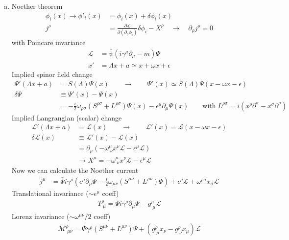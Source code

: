 \documentclass[10pt,a4paper]{report}
\theoremstyle{definition}
\begin{document}
\begin{enumerate}[a)]
\item Noether theorem
\begin{align}
\phi_i(x)\rightarrow\phi'_i(x)
&=\phi_i(x)+\delta\phi_i(x)\\
j^\rho
&=\frac{\partial\mathcal{L}}{\partial(\partial_\rho\phi_i)}\delta\phi_i-X^\rho
\quad\rightarrow\quad
\partial_\rho j^\rho=0
\end{align}
with Poincare invariance
\begin{align}
\mathcal{L}&=\bar{\psi}(i\gamma^\mu\partial_\mu-m)\Psi\\
x'&=\Lambda x+a\simeq x+\omega x+\epsilon
\end{align}
Implied spinor field change
\begin{align}
\Psi'(\Lambda x+a)&=S(\Lambda)\Psi(x)\qquad\rightarrow\qquad\Psi'(x)\simeq S(\Lambda)\Psi(x-\omega x-\epsilon)\\
\delta\Psi
&\equiv\Psi'(x)-\Psi(x)\\
&=-\frac{i}{2}\omega_{\rho\sigma}\left(S^{\rho\sigma}+L^{\rho\sigma}\right)\Psi(x)-\epsilon^\mu\partial_\mu\Psi(x)\qquad\text{with}\;L^{\rho\sigma}=i(x^\rho\partial^\sigma-x^\sigma\partial^\rho)
\end{align}
Implied Langrangian (scalar) change
\begin{align}
\mathcal{L}'(\Lambda x+a)
&=\mathcal{L}(x)\qquad\rightarrow\qquad\mathcal{L}'(x)=\mathcal{L}(x-\omega x-\epsilon)\\
\delta\mathcal{L}(x)
&\equiv\mathcal{L}'(x)-\mathcal{L}(x)\\
&=\partial_\mu(-\omega^\mu_{\;\nu} x^\nu\mathcal{L}-\epsilon^\mu \mathcal{L})\\
&\rightarrow X^\mu=-\omega^\mu_{\;\nu} x^\nu\mathcal{L}-\epsilon^\mu \mathcal{L}
\end{align}
Now we can calculate the Noether current
\begin{align}
j^\mu&=\bar{\Psi}i\gamma^\rho\left(\epsilon^\mu\partial_\mu\Psi-\frac{i}{2}\omega_{\mu\nu}(S^{\mu\nu}+L^{\mu\nu})\Psi\right)+\epsilon^\rho\mathcal{L}+\omega^{\rho\sigma}x_\sigma\mathcal{L}
\end{align}
Translational invariance ($\sim\epsilon^\mu$ coeff)
\begin{align}
T^\rho_{\;\mu}=\bar{\Psi}i\gamma^\rho\partial_\mu\Psi-g^\rho_{\;\mu}\mathcal{L}
\end{align}
Lorenz invariance ($\sim\omega^{\mu\nu}/2$ coeff)
\begin{align}
\mathcal{M}^\rho_{\;\mu\nu}=\bar{\Psi}\gamma^\rho(S^{\mu\nu}+L^{\mu\nu})\Psi+(g^\rho_{\;\mu}x_\nu-g^\rho_{\;\nu}x_\mu)\mathcal{L}
\end{align}

\end{enumerate}
\end{document}
